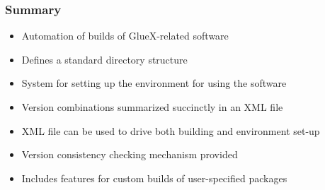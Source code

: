 \documentclass{beamer}
\begin{document}
\begin{frame}
  \frametitle{Summary}

\begin{itemize}
\item Automation of builds of GlueX-related software
\item Defines a standard directory structure
\item System for setting up the environment for using the software
\item Version combinations summarized succinctly in an XML file
\item XML file can be used to drive both building and environment set-up
\item Version consistency checking mechanism provided
\item Includes features for custom builds of user-specified packages
\end{itemize}
\end{frame}
\end{document}
